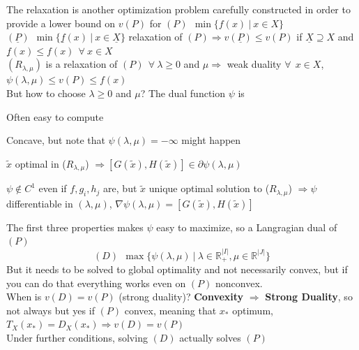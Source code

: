 \documentclass[10pt]{report}
\begin{document}
The relaxation is another optimization problem carefully constructed in order to provide a lower bound on $v(P)$ for $(P)\:\:\min\{f(x)\:|\:x\in X\}$\\
$(\underline{P})\:\:\min\{\underline{f}(x)\:|\:x\in \underline{X}\}$ relaxation of $(P) \Rightarrow v(\underline{P})\leq v(P)$ if $\underline{X}\supseteq X$ and $\underline{f}(x)\leq f(x)\:\:\forall\:x\in X$\\
$(R_{\lambda,\mu})$ is a relaxation of $(P)\:\:\forall\:\lambda\geq 0$ and $\mu\Rightarrow$ weak duality $\forall\:\:x\in X$, $\psi(\lambda,\mu)\leq v(P)\leq f(x)$\\
But how to choose $\lambda\geq 0$ and $\mu$? The dual function $\psi$ is \begin{list}{}{}
	\item Often easy to compute
	\item Concave, but note that $\psi(\lambda,\mu)=-\infty$ might happen
	\item $\tilde{x}$ optimal in ($R_{\lambda,\mu}$) $\Rightarrow [G(\tilde{x}), H(\tilde{x})]\in \partial\psi(\lambda,\mu)$
	\item $\psi\not\in C^1$ even if $f,g_i,h_j$ are, but $\tilde{x}$ unique optimal solution to ($R_{\lambda,\mu}$) $\Rightarrow \psi$ differentiable in $(\lambda, \mu)$, $\nabla \psi(\lambda, \mu)= [G(\tilde{x}), H(\tilde{x})]$
\end{list}
The first three properties makes $\psi$ easy to maximize, so a Langragian dual of $(P)$ $$(D)\:\:\max\{\psi(\lambda,\mu)\:|\:\lambda\in \mathbb{R}_+^{|I|},\mu\in \mathbb{R}^{|J|}\}$$ But it needs to be solved to global optimality and not necessarily convex, but if you can do that everything works even on $(P)$ nonconvex.\\
When is $v(D) = v(P)$ (strong duality)?  \textbf{Convexity} $\Rightarrow$ \textbf{Strong Duality}, so not always but yes if $(P)$ convex, meaning that $x_*$ optimum, $T_X(x_*)=D_X(x_*)\Rightarrow v(D) = v(P)$\\
Under further conditions, solving $(D)$ actually solves $(P)$
\end{document}

